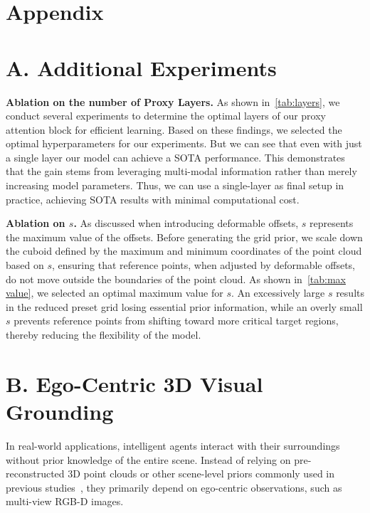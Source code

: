 \clearpage


\section*{{\large Appendix}}




\section*{A. Additional Experiments}

\noindent \textbf{Ablation on the number of Proxy Layers.}
As shown in~\cref{tab:layers}, we conduct several experiments to determine the optimal layers of our proxy attention block for efficient learning. Based on these findings, we selected the optimal hyperparameters for our experiments. But we can see that even with just a single layer our model can achieve a SOTA performance. This demonstrates that the gain stems from leveraging multi-modal information rather than merely increasing model parameters. Thus, we can use a single-layer as final setup in practice, achieving SOTA results with minimal computational cost.



\noindent \textbf{Ablation on $s$.}
As discussed when introducing deformable offsets, \(s\) represents the maximum value of the offsets. Before generating the grid prior, we scale down the cuboid defined by the maximum and minimum coordinates of the point cloud based on \(s\), ensuring that reference points, when adjusted by deformable offsets, do not move outside the boundaries of the point cloud. As shown in~\cref{tab:max value}, we selected an optimal maximum value for \(s\). An excessively large \(s\) results in the reduced preset grid losing essential prior information, while an overly small \(s\) prevents reference points from shifting toward more critical target regions, thereby reducing the flexibility of the model.

\section*{B. Ego-Centric 3D Visual Grounding}

In real-world applications, intelligent agents interact with their surroundings without prior knowledge of the entire scene. Instead of relying on pre-reconstructed 3D point clouds or other scene-level priors commonly used in previous studies~\citep{wu2024pointv3, huang2023segment3d}, they primarily depend on ego-centric observations, such as multi-view RGB-D images.

